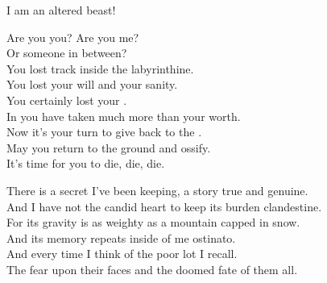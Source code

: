 I am an altered beast! \\





Are you you? Are you me? \\
Or someone in between? \\
You lost track inside the labyrinthine. \\

You lost your will and your sanity. \\
You certainly lost your . \\

In  you have taken much more than your worth. \\
Now it's your turn to give back to the . \\

May you return to the ground and ossify. \\
It's time for you to die, die, die. \\









There is a secret I've been keeping, a story true and genuine. \\
And I have not the candid heart to keep its burden clandestine. \\

For its gravity is as weighty as a mountain capped in snow. \\
And its memory repeats inside of me ostinato. \\

And every time I think of the poor lot I recall. \\
The fear upon their faces and the doomed fate of them all. \\

